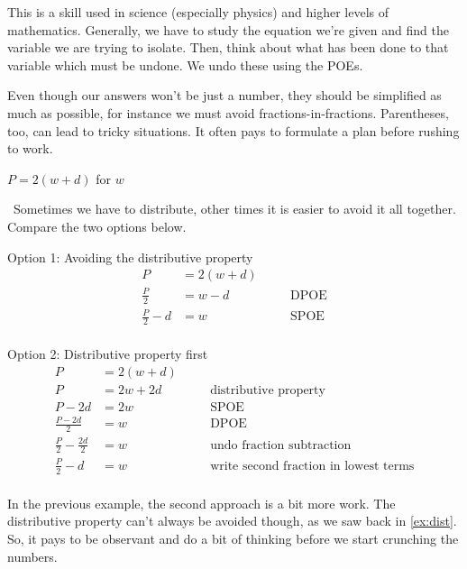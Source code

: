 This is a skill used in science (especially physics) and higher levels of mathematics. Generally, we have to study the equation we're given and find the variable we are trying to isolate. Then, think about what has been done to that variable which must be undone. We undo these using the POEs.


Even though our answers won't be just a number, they should be simplified as much as possible, for instance we must avoid fractions-in-fractions. Parentheses, too, can lead to tricky situations. It often pays to formulate a plan before rushing to work.

\begin{boxedex}
$P = 2( w + d )$ for $w$

\exsoln\ Sometimes we have to distribute, other times it is easier to avoid it all together. Compare the two options below.

Option 1: Avoiding the distributive property
\[\begin{aligned}
P &= 2(w + d)\\
\tfrac{P}{2} &= w - d
&&\quad\text{DPOE}\\
\tfrac{P}{2} - d &= w
&&\quad\text{SPOE}\\
\end{aligned}\]

Option 2: Distributive property first
\[\begin{aligned}
P &= 2(w + d)\\
P &= 2w + 2d
&&\quad\text{distributive property}\\
P - 2d &= 2w
&&\quad\text{SPOE}\\
\tfrac{P - 2d}{2}&= w
&&\quad\text{DPOE}\\
\tfrac{P}{2} - \tfrac{2d}{2}&= w
&&\quad\text{undo fraction subtraction}\\
\tfrac{P}{2} - d&= w
&&\quad\text{write second fraction in lowest terms}\\
\end{aligned}\]
\end{boxedex}

In the previous example, the second approach is a bit more work. The distributive property can't always be avoided though, as we saw back in \cref{ex:dist}. So, it pays to be observant and do a bit of thinking before we start crunching the numbers.

